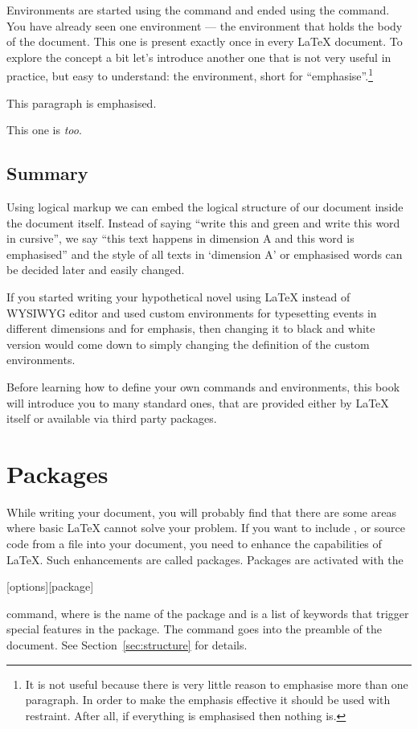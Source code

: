 Environments are started using the  command and ended using the
 command. You have already seen one environment --- the
 environment that holds the body of the document. This one is
present exactly once in every \LaTeX{} document. To explore the concept a bit
let's introduce another one that is not very useful in practice, but easy to
understand: the  environment, short for
\enquote{emphasise}.\footnote{It is not useful because there is very little
  reason to emphasise more than one paragraph. In order to make the emphasis
  effective it should be used with restraint. After all, if everything is
  emphasised then nothing is.}
\begin{example}
\begin{em}
  This paragraph is emphasised.

  This one is \emph{too}.
\end{em}
\end{example}

\subsection{Summary}

Using logical markup we can embed the logical structure of our document inside
the document itself. Instead of saying \enquote{write this and green and write
  this word in cursive}, we say \enquote{this text happens in dimension A and
  this word is emphasised} and the style of all texts in \enquote*{dimension A}
or emphasised words can be decided later and easily changed.

If you started writing your hypothetical novel using \LaTeX{} instead of
WYSIWYG editor and used custom environments for typesetting events in different
dimensions and  for emphasis, then changing it to black and white
version would come down to simply changing the definition of the custom
environments.

Before learning how to define your own commands and environments, this book
will introduce you to many standard ones, that are provided either by \LaTeX{}
itself or available via third party packages.

\section{Packages} While writing your document, you will
probably find that there are some areas where basic \LaTeX{} cannot solve your
problem. If you want to include ,  or source
code from a file into your document, you need to enhance the capabilities of
\LaTeX. Such enhancements are called packages. Packages are activated with the
\begin{lscommand}
  [options][package]
\end{lscommand}
command, where  is the name of the package and
 is a list of keywords that trigger special features in
the package. The  command goes into the preamble of the
document. See Section~\ref{sec:structure} for details.

